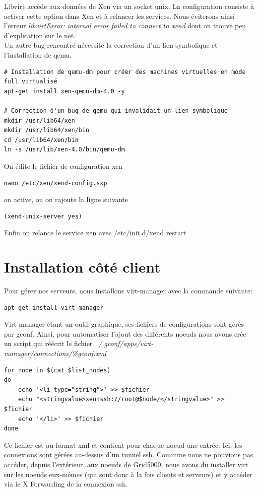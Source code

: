 Libvirt accède aux données de Xen via un socket unix. La configuration consiste à activer cette option dans Xen et à relancer les services.
Nous éviterons ainsi l’erreur \emph{libvirtError: internal error failed to connect to xend} dont on trouve peu d’explication sur le net.
\\
Un autre bug rencontré nécessite la correction d'un lien symbolique et l'installation de qemu.

\begin{lstlisting}
# Installation de qemu-dm pour créer des machines virtuelles en mode full virtualisé
apt-get install xen-qemu-dm-4.0 -y

# Correction d'un bug de qemu qui invalidait un lien symbolique
mkdir /usr/lib64/xen
mkdir /usr/lib64/xen/bin
cd /usr/lib64/xen/bin
ln -s /usr/lib/xen-4.0/bin/qemu-dm
\end{lstlisting} 

On édite le fichier de configuration xen
\begin{lstlisting} 
nano /etc/xen/xend-config.sxp
\end{lstlisting}
 on active, ou on rajoute la ligne suivante
\begin{lstlisting} 
(xend-unix-server yes)
\end{lstlisting}
 Enfin on relance le service xen avec /etc/init.d/xend restart

\section{Installation côté client}
Pour gérer nos serveurs, nous installons virt-manager avec la commande suivante:
\begin{lstlisting} 
apt-get install virt-manager
\end{lstlisting}
Virt-manager étant un outil graphique, ses fichiers de configurations sont gérés par gconf. Ainsi, pour automatiser l'ajout des différents noeuds nous avons crée un script qui réécrit le fichier \emph{~/.gconf/apps/virt-manager/connections/\%gconf.xml}
\begin{lstlisting}
for node in $(cat $list_nodes)
do
    echo '<li type="string">' >> $fichier
    echo "<stringvalue>xen+ssh://root@$node/</stringvalue>" >> $fichier
    echo '</li>' >> $fichier
done
\end{lstlisting}
Ce fichier est au format xml et contient pour chaque noeud une entrée. Ici, les connexions sont gérées au-dessus d'un tunnel ssh. Commme nous ne pouvions pas accéder, depuis l'extérieur, aux noeuds de Grid5000, nous avons du installer virt sur les noeuds eux-mêmes (qui sont donc à la fois clients et serveurs) et y accéder via le X Forwarding de la connexion ssh.
